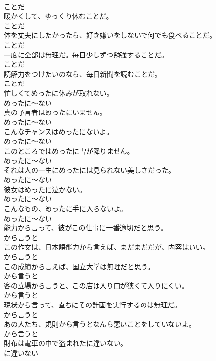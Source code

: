 \documentclass[8pt]{extreport}
\begin{document}
\begin{CJK}{UTF8}{min}
\\	ことだ
\\	暖かくして、ゆっくり休むことだ。	
\\	ことだ
\\	体を丈夫にしたかったら、好き嫌いをしないで何でも食べることだ。	
\\	ことだ
\\	一度に全部は無理だ。毎日少しずつ勉強することだ。	
\\	ことだ
\\	読解力をつけたいのなら、毎日新聞を読むことだ。	
\\	ことだ
\\	忙しくてめったに休みが取れない。	
\\	めったに～ない
\\	真の予言者はめったにいません。	
\\	めったに～ない
\\	こんなチャンスはめったにないよ。	
\\	めったに～ない
\\	このところではめったに雪が降りません。	
\\	めったに～ない
\\	それは人の一生にめったには見られない美しさだった。	
\\	めったに～ない
\\	彼女はめったに泣かない。	
\\	めったに～ない
\\	こんなもの、めったに手に入らないよ。	
\\	めったに～ない
\\	能力から言って、彼がこの仕事に一番適切だと思う。	
\\	から言うと
\\	この作文は、日本語能力から言えば、まだまだだが、内容はいい。	
\\	から言うと
\\	この成績から言えば、国立大学は無理だと思う。	
\\	から言うと
\\	客の立場から言うと、この店は入り口が狭くて入りにくい。	
\\	から言うと
\\	現状から言って、直ちにその計画を実行するのは無理だ。	
\\	から言うと
\\	あの人たち、規則から言うとなんら悪いことをしていないよ。	
\\	から言うと
\\	財布は電車の中で盗まれたに違いない。	
\\	に違いない

\end{CJK}
\end{document}
